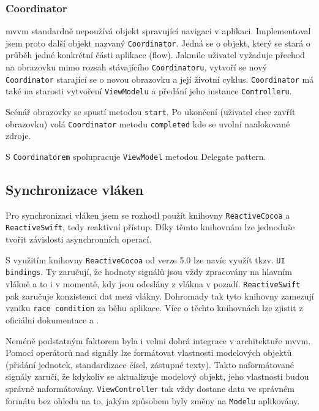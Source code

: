\subsubsection*{Coordinator}

\acrshort{mvvm} standardně nepoužívá objekt spravující navigaci v aplikaci.
Implementoval jsem proto další objekt nazvaný \texttt{Coordinator}.
Jedná se o objekt, který se stará o průběh jedné konkrétní části aplikace (flow).
Jakmile uživatel vyžaduje přechod na obrazovku mimo rozsah stávajícího \texttt{Coordinatoru}, vytvoří se nový \texttt{Coordinator} starající se o novou obrazovku a její životní cyklus.
\texttt{Coordinator} má také na starosti vytvoření \texttt{ViewModelu} a předání jeho instance \texttt{Controlleru}.

Scénář obrazovky se spustí metodou \texttt{start}.
Po ukončení (uživatel chce zavřít obrazovku) volá \texttt{Coordinator} metodu \texttt{completed} kde se uvolní naalokované zdroje.

S \texttt{Coordinatorem} spolupracuje \texttt{ViewModel} metodou Delegate pattern.

\subsection{Synchronizace vláken}

Pro synchronizaci vláken jsem se rozhodl použít knihovny \texttt{ReactiveCocoa} a \texttt{ReactiveSwift}, tedy reaktivní přístup.
Díky těmto knihovnám lze jednoduše tvořit závislosti asynchronních operací.

S využitím knihovny \texttt{ReactiveCocoa} od verze 5.0 lze navíc využít tkzv. \texttt{UI bindings}.
Ty zaručují, že hodnoty signálů jsou vždy zpracovány na hlavním vlákně a to i v momentě, kdy jsou odeslány z vlákna v pozadí.
\texttt{ReactiveSwift} pak zaručuje konzistenci dat mezi vlákny.
Dohromady tak tyto knihovny zamezují vzniku \texttt{race condition} za běhu aplikace.
Více o těchto knihovnách lze zjistit z oficiální dokumentace \cite{github-reactiveswift} a \cite{github-reactivecocoa}.

Neméně podstatným faktorem byla i velmi dobrá integrace v architektuře \acrshort{mvvm}.
Pomocí operátorů nad signály lze formátovat vlastnosti modelových objektů (přidání jednotek, standardizace čísel, zástupné texty).
Takto naformátované signály zaručí, že kdykoliv se aktualizuje modelový objekt, jeho vlastnosti budou správně naformátovány.
\texttt{ViewController} tak vždy dostane data ve správném formátu bez ohledu na to, jakým způsobem byly změny na \texttt{Modelu} aplikovány.

